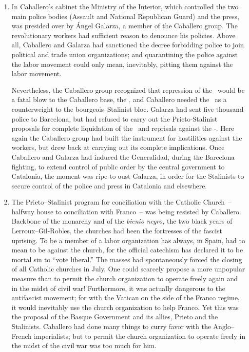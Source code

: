 \begin{enumerate}
  \item In Caballero’s cabinet the Ministry of the Interior, which controlled the two main police bodies (Assault and National Republican Guard) and the press, was presided over by \'Angel Galarza, a member of the Caballero group. The revolutionary workers had sufficient reason to denounce his policies. Above all, Caballero and Galarza had sanctioned the decree forbidding police to join political and trade union organizations; and quarantining the police against the labor movement could only mean, inevitably, pitting them against the labor movement.
  
  Nevertheless, the Caballero group recognized that repression of the \CNT\ would be a fatal blow to the Caballero base, the \UGT, and Caballero needed the \CNT\ as a counterweight to the bourgeois--Stalinist bloc. Galarza had sent five thousand police to Barcelona, but had refused to carry out the Prieto-Stalinist proposals for complete liquidation of the \POUM\ and reprisals against the \FAI-\CNT. Here again the Caballero group had built the instrument for hostilities against the workers, but drew back at carrying out its complete implications. Once Caballero and Galarza had induced the Generalidad, during the Barcelona fighting, to extend control of public order by the central government to Catalonia, the moment was ripe to oust Galarza, in order for the Stalinists to secure control of the police and press in Catalonia and elsewhere.
  
  \item The Prieto--Stalinist program for conciliation with the Catholic Church~-- halfway house to conciliation with Franco~-- was being resisted by Caballero. Backbone of the monarchy and of the \emph{bienio negro,} the two black years of Lerroux--Gil-Robles, the churches had been the fortresses of the fascist uprising. To be a member of a labor organization has always, in Spain, had to mean to be against the church, for the official catechism has declared it to be mortal sin to ``vote liberal.\kn\kn'' The masses had spontaneously forced the closing of all Catholic churches in July. One could scarcely propose a more unpopular measure than to permit the church organization to operate freely again and in the midst of civil war! Furthermore, it was actually dangerous to the antifascist movement; for with the Vatican on the side of the Franco regime, it would inevitably use the church organization to help Franco. Yet this was the proposal of the Basque Government and its allies, Prieto and the Stalinists. Caballero had done many things to curry favor with the Anglo--French imperialists; but to permit the church organization to operate freely in the midst of the civil war was too much for him.
\end{enumerate}

